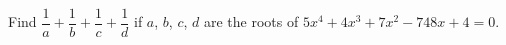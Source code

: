 Find $\dfrac1a+\dfrac1b+\dfrac1c+\dfrac1d$ if $a$, $b$, $c$, $d$ are the roots of $5x^4+4x^3+7x^2-748x+4=0$.
